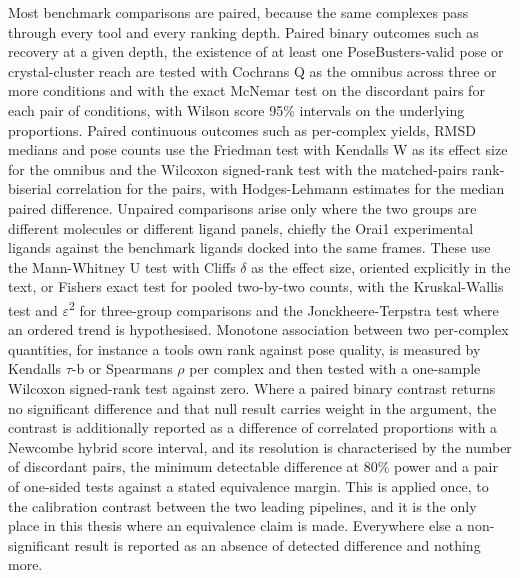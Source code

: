 Most benchmark comparisons are paired, because the same complexes pass through every tool and every ranking depth. Paired binary outcomes such as recovery at a given depth, the existence of at least one PoseBusters-valid pose or crystal-cluster reach are tested with Cochran\textquotesingle s Q as the omnibus across three or more conditions and with the exact McNemar test on the discordant pairs for each pair of conditions, with Wilson score 95\% intervals on the underlying proportions. Paired continuous outcomes such as per-complex yields, RMSD medians and pose counts use the Friedman test with Kendall\textquotesingle s W as its effect size for the omnibus and the Wilcoxon signed-rank test with the matched-pairs rank-biserial correlation for the pairs, with Hodges-Lehmann estimates for the median paired difference. Unpaired comparisons arise only where the two groups are different molecules or different ligand panels, chiefly the Orai1 experimental ligands against the benchmark ligands docked into the same frames. These use the Mann-Whitney U test with Cliff\textquotesingle s \ensuremath{\delta} as the effect size, oriented explicitly in the text, or Fisher\textquotesingle s exact test for pooled two-by-two counts, with the Kruskal-Wallis test and \ensuremath{\varepsilon}\textsuperscript{2} for three-group comparisons and the Jonckheere-Terpstra test where an ordered trend is hypothesised. Monotone association between two per-complex quantities, for instance a tool\textquotesingle s own rank against pose quality, is measured by Kendall\textquotesingle s \ensuremath{\tau}-b or Spearman\textquotesingle s \ensuremath{\rho} per complex and then tested with a one-sample Wilcoxon signed-rank test against zero. Where a paired binary contrast returns no significant difference and that null result carries weight in the argument, the contrast is additionally reported as a difference of correlated proportions with a Newcombe hybrid score interval, and its resolution is characterised by the number of discordant pairs, the minimum detectable difference at 80\% power and a pair of one-sided tests against a stated equivalence margin. This is applied once, to the calibration contrast between the two leading pipelines, and it is the only place in this thesis where an equivalence claim is made. Everywhere else a non-significant result is reported as an absence of detected difference and nothing more.

